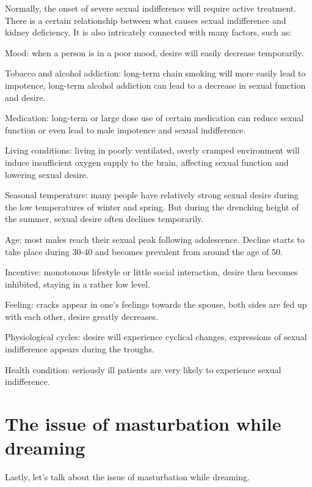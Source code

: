 \documentclass[
]{book}
\begin{document}
Normally, the onset of severe sexual indifference will require active treatment. There is a certain relationship between what causes sexual indifference and kidney deficiency. It is also intricately connected with many factors, such as:

Mood: when a person is in a poor mood, desire will easily decrease temporarily.

Tobacco and alcohol addiction: long-term chain smoking will more easily lead to impotence, long-term alcohol addiction can lead to a decrease in sexual function and desire.

Medication: long-term or large dose use of certain medication can reduce sexual function or even lead to male impotence and sexual indifference.

Living conditions: living in poorly ventilated, overly cramped environment will induce insufficient oxygen supply to the brain, affecting sexual function and lowering sexual desire.

Seasonal temperature: many people have relatively strong sexual desire during the low temperatures of winter and spring. But during the drenching height of the summer, sexual desire often declines temporarily.

Age: most males reach their sexual peak following adolescence. Decline starts to take place during 30-40 and becomes prevalent from around the age of 50.

Incentive: monotonous lifestyle or little social interaction, desire then becomes inhibited, staying in a rather low level.

Feeling: cracks appear in one's feelings towards the spouse, both sides are fed up with each other, desire greatly decreases.

Physiological cycles: desire will experience cyclical changes, expressions of sexual indifference appears during the troughs.

Health condition: seriously ill patients are very likely to experience sexual indifference.

\hypertarget{the-issue-of-masturbation-while-dreaming}{%
\section{The issue of masturbation while dreaming}\label{the-issue-of-masturbation-while-dreaming}}

Lastly, let's talk about the issue of masturbation while dreaming.
\end{document}
